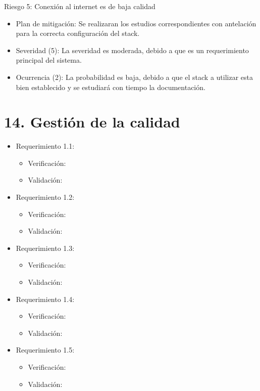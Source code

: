 \documentclass[
11pt, %
]{charter}
\begin{document}
Riesgo 5: Conexión al internet es de baja calidad
\begin{itemize}
	\item Plan de mitigación: Se realizaran los estudios correspondientes con antelación para la correcta configuración del stack.
	\item Severidad (5): La severidad es moderada, debido a que es un requerimiento principal del sistema.
	\item Ocurrencia (2): La probabilidad es baja, debido a que el stack a utilizar esta bien establecido y se estudiará con tiempo la documentación.
\end{itemize}



\section{14. Gestión de la calidad}
\label{sec:calidad}
\begin{itemize}
\item Requerimiento 1.1: 
	\begin{itemize}
		\item Verificación:
		\item Validación:
	\end{itemize}
\item Requerimiento 1.2: 
	\begin{itemize}
		\item Verificación:
		\item Validación:
	\end{itemize}
\item Requerimiento 1.3: 
	\begin{itemize}
		\item Verificación:
		\item Validación:
	\end{itemize}
\item Requerimiento 1.4: 
	\begin{itemize}
		\item Verificación:
		\item Validación:
	\end{itemize}
\item Requerimiento 1.5: 
	\begin{itemize}
		\item Verificación:
		\item Validación:
	\end{itemize}
\end{itemize}
\end{document}
